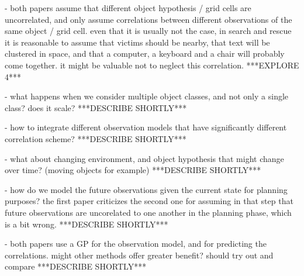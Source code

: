 \documentclass{article}
\begin{document}
	- both papers assume that different object hypothesis / grid cells are uncorrelated, and only assume correlations between different observations of the same object / grid cell. even that it is usually not the case, in search and rescue it is reasonable to assume that victims should be nearby, that text will be clustered in space, and that a computer, a keyboard and a chair will probably come together. it might be valuable not to neglect this correlation.
	***EXPLORE 4***
	
	- what happens when we consider multiple object classes, and not only a single class? does it scale?
	***DESCRIBE SHORTLY***
	
	- how to integrate different observation models that have significantly different correlation scheme?
	***DESCRIBE SHORTLY***
	
	- what about changing environment, and object hypothesis that might change over time? (moving objects for example)
	***DESCRIBE SHORTLY***
	
	- how do we model the future observations given the current state for planning purposes? the first paper criticizes the second one for assuming in that step that future observations are uncorelated to one another in the planning phase, which is a bit wrong.  
	***DESCRIBE SHORTLY***
	
	- both papers use a GP for the observation model, and for predicting the correlations. might other methods offer greater benefit? should try out and compare
	***DESCRIBE SHORTLY***
	
	
	
  
\end{document}
